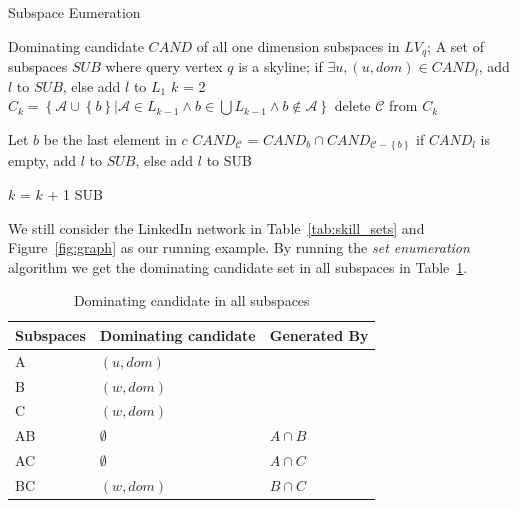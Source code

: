 \begin{algorithm}[H]
  \caption{Subspace Eumeration}\label{algo:blah}
    \begin{algorithmic}[1]
  \show\LOOP
    \REQUIRE Dominating candidate $\mathit{CAND}$ of all one dimension subspaces in $LV_q$;
    \ENSURE A set of subspaces $SUB$ where query vertex $q$ is a skyline;
            \STATE if $\exists u, (u, dom)\in \mathit{CAND}_l$, add $l$ to $SUB$, else add $l$ to $L_1$
        \ENDFOR
        \STATE $k$ = 2
            \STATE $C_k = \left\{\mathcal{A} \cup \left\{b\right\} | \mathcal{A} \in L_{k-1} \wedge b \in \bigcup L_{k-1} \wedge b \notin \mathcal{A} \right\}$
                        \STATE delete $\mathcal{C}$ from $C_k$
                    \ENDIF
                \ENDFOR
            \ENDFOR
            
                \STATE Let $b$ be the last element in $c$
                \STATE $CAND_\mathcal{C}$ = $CAND_b \cap CAND_{\mathcal{C}-\left\{b\right\}}$
                \STATE if $CAND_l$ is empty, add $l$ to $SUB$, else add $l$ to SUB
            \ENDFOR
            
            \STATE $k$ = $k$ + 1
        \ENDWHILE
        \RETURN SUB
  \end{algorithmic}
\end{algorithm}

We still consider the LinkedIn network in Table~\ref{tab:skill_sets} and Figure~\ref{fig:graph} as our running example. By running the \emph{set enumeration} algorithm we get the dominating candidate set in all subspaces in Table~\ref{tab:sub_dom_cand_pruned}.

\begin{table}[H]
    \centering
    \begin{tabular}{|l|l|l|}
    \hline
    Subspaces & Dominating candidate & Generated By \\ \hline
    A         & $(u, dom)$  &              \\ \hline
    B         & $(w, dom)$  &              \\ \hline
    C         & $(w, dom)$  &              \\ \hline
    AB        & $\emptyset$           & $A \cap B$   \\ \hline
    AC        & $\emptyset$           & $A \cap C$   \\ \hline
    BC        & $(w, dom)$            & $B \cap C$   \\ \hline
    \end{tabular}
    \caption{Dominating candidate in all subspaces}
    \label{tab:sub_dom_cand_pruned}
\end{table}

